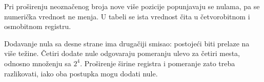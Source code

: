 Pri proširenju neoznačenog broja nove više pozicije popunjavaju se nulama, pa se numerička vrednost ne menja. U tabeli se ista vrednost čita u četvorobitnom i osmobitnom registru.

Dodavanje nula sa desne strane ima drugačiji smisao: postojeći biti prelaze na više težine. Četiri dodate nule odgovaraju pomeranju ulevo za četiri mesta, odnosno množenju sa $2^4$. Proširenje širine registra i pomeranje zato treba razlikovati, iako oba postupka mogu dodati nule.
